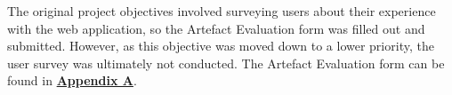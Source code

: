 The original project objectives involved surveying users about their experience with the web application, so the Artefact Evaluation form was filled out and submitted. However, as this objective was moved down to a lower priority, the user survey was ultimately not conducted. The Artefact Evaluation form can be found in \textbf{\hyperref[appendix:artefact]{Appendix A}}.